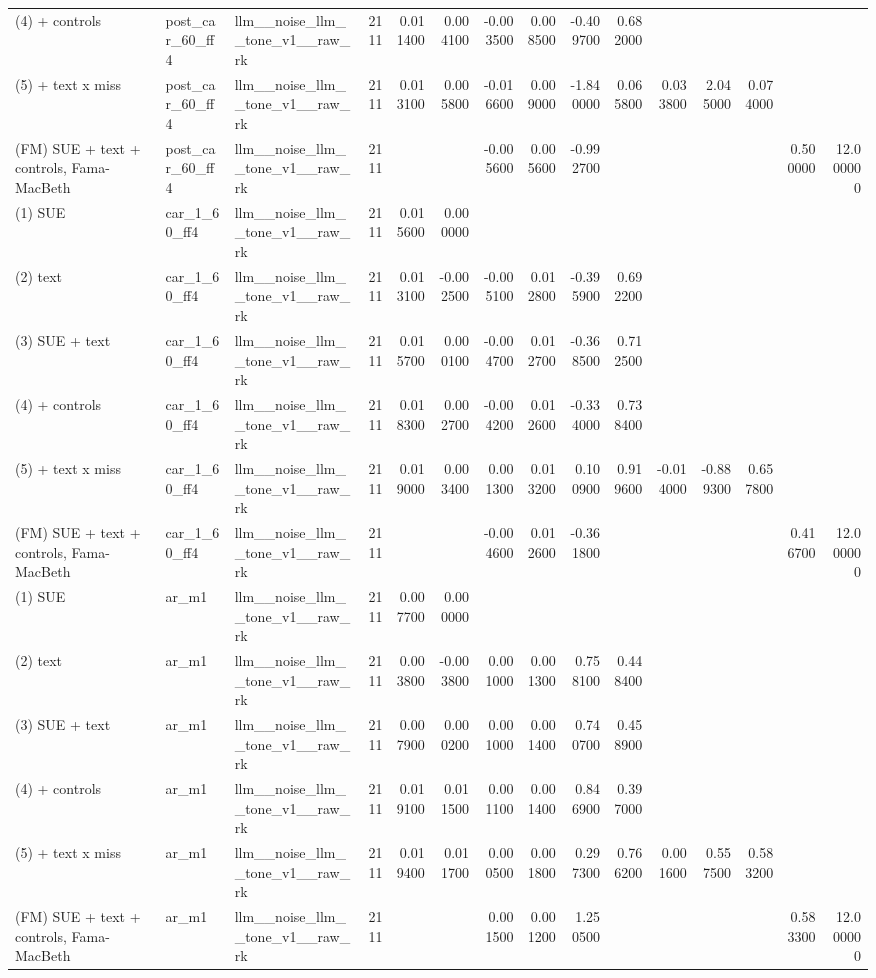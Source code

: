 \begin{table}
\begin{tabular}{lllrrrrrrrrrrrr}
(4) + controls & post\_car\_60\_ff4 & llm\_\_noise\_llm\_\_tone\_v1\_\_raw\_rk & 2111 & 0.011400 & 0.004100 & -0.003500 & 0.008500 & -0.409700 & 0.682000 &  &  &  &  &  \\
(5) + text x miss & post\_car\_60\_ff4 & llm\_\_noise\_llm\_\_tone\_v1\_\_raw\_rk & 2111 & 0.013100 & 0.005800 & -0.016600 & 0.009000 & -1.840000 & 0.065800 & 0.033800 & 2.045000 & 0.074000 &  &  \\
(FM) SUE + text + controls, Fama-MacBeth & post\_car\_60\_ff4 & llm\_\_noise\_llm\_\_tone\_v1\_\_raw\_rk & 2111 &  &  & -0.005600 & 0.005600 & -0.992700 &  &  &  &  & 0.500000 & 12.000000 \\
(1) SUE & car\_1\_60\_ff4 & llm\_\_noise\_llm\_\_tone\_v1\_\_raw\_rk & 2111 & 0.015600 & 0.000000 &  &  &  &  &  &  &  &  &  \\
(2) text & car\_1\_60\_ff4 & llm\_\_noise\_llm\_\_tone\_v1\_\_raw\_rk & 2111 & 0.013100 & -0.002500 & -0.005100 & 0.012800 & -0.395900 & 0.692200 &  &  &  &  &  \\
(3) SUE + text & car\_1\_60\_ff4 & llm\_\_noise\_llm\_\_tone\_v1\_\_raw\_rk & 2111 & 0.015700 & 0.000100 & -0.004700 & 0.012700 & -0.368500 & 0.712500 &  &  &  &  &  \\
(4) + controls & car\_1\_60\_ff4 & llm\_\_noise\_llm\_\_tone\_v1\_\_raw\_rk & 2111 & 0.018300 & 0.002700 & -0.004200 & 0.012600 & -0.334000 & 0.738400 &  &  &  &  &  \\
(5) + text x miss & car\_1\_60\_ff4 & llm\_\_noise\_llm\_\_tone\_v1\_\_raw\_rk & 2111 & 0.019000 & 0.003400 & 0.001300 & 0.013200 & 0.100900 & 0.919600 & -0.014000 & -0.889300 & 0.657800 &  &  \\
(FM) SUE + text + controls, Fama-MacBeth & car\_1\_60\_ff4 & llm\_\_noise\_llm\_\_tone\_v1\_\_raw\_rk & 2111 &  &  & -0.004600 & 0.012600 & -0.361800 &  &  &  &  & 0.416700 & 12.000000 \\
(1) SUE & ar\_m1 & llm\_\_noise\_llm\_\_tone\_v1\_\_raw\_rk & 2111 & 0.007700 & 0.000000 &  &  &  &  &  &  &  &  &  \\
(2) text & ar\_m1 & llm\_\_noise\_llm\_\_tone\_v1\_\_raw\_rk & 2111 & 0.003800 & -0.003800 & 0.001000 & 0.001300 & 0.758100 & 0.448400 &  &  &  &  &  \\
(3) SUE + text & ar\_m1 & llm\_\_noise\_llm\_\_tone\_v1\_\_raw\_rk & 2111 & 0.007900 & 0.000200 & 0.001000 & 0.001400 & 0.740700 & 0.458900 &  &  &  &  &  \\
(4) + controls & ar\_m1 & llm\_\_noise\_llm\_\_tone\_v1\_\_raw\_rk & 2111 & 0.019100 & 0.011500 & 0.001100 & 0.001400 & 0.846900 & 0.397000 &  &  &  &  &  \\
(5) + text x miss & ar\_m1 & llm\_\_noise\_llm\_\_tone\_v1\_\_raw\_rk & 2111 & 0.019400 & 0.011700 & 0.000500 & 0.001800 & 0.297300 & 0.766200 & 0.001600 & 0.557500 & 0.583200 &  &  \\
(FM) SUE + text + controls, Fama-MacBeth & ar\_m1 & llm\_\_noise\_llm\_\_tone\_v1\_\_raw\_rk & 2111 &  &  & 0.001500 & 0.001200 & 1.250500 &  &  &  &  & 0.583300 & 12.000000 \\
\bottomrule
\end{tabular}
\end{table}

